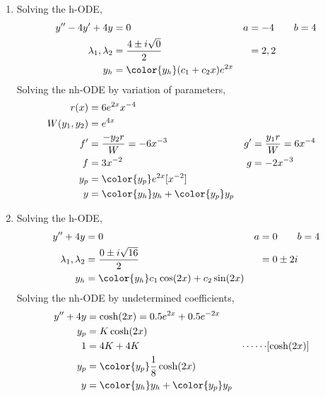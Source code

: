 \begin{enumerate}
    \item Solving the h-ODE,
          \begin{align}
              y'' - 4y' + 4y           & = 0                                    & a & = -4 \qquad b = 4 \\
              \lambda_{1}, \lambda_{2} & = \frac{4 \pm i\sqrt{0}}{2}            &   & = 2, 2            \\
              y_{h}                    & = {\color{y_h} (c_{1} + c_{2}x)e^{2x}}
          \end{align}
          Solving the nh-ODE by variation of parameters,
          \begin{align}
              r(x)            & = 6e^{2x}x^{-4}                                                                 \\
              W(y_{1}, y_{2}) & = e^{4x}                                                                        \\
              f'              & = \frac{-y_{2}r}{W} = -6x^{-3}              & g' & = \frac{y_{1}r}{W} = 6x^{-4} \\
              f               & = 3x^{-2}                                   & g  & = -2x^{-3}                   \\
              y_{p}           & = {\color{y_p} e^{2x}[x^{-2}]}                                                  \\
              y               & = {\color{y_h} y_{h}} + {\color{y_p} y_{p}}
          \end{align}

    \item Solving the h-ODE,
          \begin{align}
              y'' + 4y                 & = 0                                           & a & = 0 \qquad b = 4 \\
              \lambda_{1}, \lambda_{2} & = \frac{0 \pm i\sqrt{16}}{2}                  &   & = 0 \pm 2i       \\
              y_{h}                    & = {\color{y_h} c_{1}\cos(2x) + c_{2}\sin(2x)}
          \end{align}
          Solving the nh-ODE by undetermined coefficients,
          \begin{align}
              y'' + 4y & = \cosh(2x) = 0.5e^{2x} + 0.5e^{-2x}                                     \\
              y_{p}    & = K\cosh(2x)                                                             \\
              1        & =  4K + 4K                                  & \cdots\cdots & [\cosh(2x)] \\
              y_{p}    & = {\color{y_p} \frac{1}{8}\cosh(2x)}                                     \\
              y        & = {\color{y_h} y_{h}} + {\color{y_p} y_{p}}
          \end{align}


\end{enumerate}
